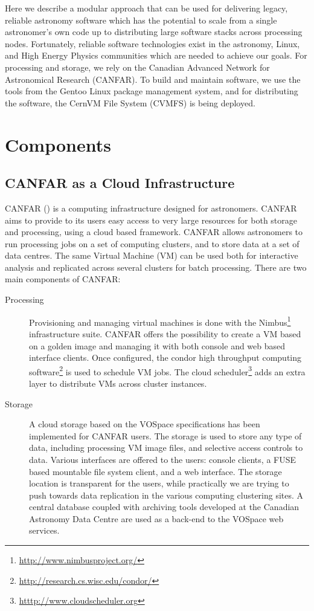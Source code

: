 Here we describe a modular approach that can be used for delivering legacy, reliable astronomy software which has the potential to scale from a single astronomer's own code up to distributing large software stacks across processing nodes. Fortunately, reliable software technologies exist in the astronomy, Linux, and High Energy Physics communities which are needed to achieve our goals. For processing and storage, we rely on the Canadian Advanced Network for Astronomical Research (CANFAR). To build and maintain software, we use the tools from the Gentoo Linux package management system, and for distributing the software, the CernVM File System (CVMFS) is being deployed.

\section{Components}
\subsection{CANFAR as a Cloud Infrastructure}
CANFAR (\cite{canfar}) is a computing infrastructure designed for astronomers. CANFAR aims to provide to its users easy access to very large resources for both storage and processing, using a cloud based framework. CANFAR allows astronomers to run processing jobs on a set of computing clusters, and to store data at a set of data centres. The same Virtual Machine (VM) can be used both for interactive analysis and replicated across several clusters for batch processing. There are two main components of CANFAR:
\begin{description}
\item[Processing] Provisioning and managing virtual machines is done   with the Nimbus\footnote{\url{http://www.nimbusproject.org/}}   infrastructure suite. CANFAR offers the possibility to create a VM based on a golden image and managing it with both console and web based interface clients. Once configured, the condor high throughput computing software\footnote{\url{http://research.cs.wisc.edu/condor/}} is used to schedule VM jobs. The cloud scheduler\footnote{\url{htttp://www.cloudscheduler.org}} adds an extra layer to distribute VMs across cluster instances.
\item[Storage] A cloud storage based on the VOSpace specifications has been implemented for CANFAR users. The storage is used to store any type of data, including processing VM image files, and selective access controls to data. Various interfaces are offered to the users: console clients, a FUSE based mountable file system client, and a web interface. The storage location is transparent for the users, while practically we are trying to push towards data replication in the various computing clustering sites. A central database coupled with archiving tools developed at the Canadian Astronomy Data Centre are used as a back-end to the VOSpace web services.
\end{description}

